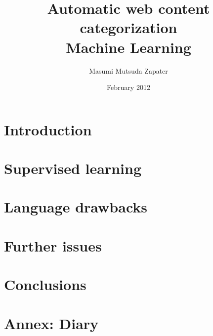 \documentclass[a4paper , titlepage]{report}
\author{Masumi Mutsuda Zapater}
\title{Automatic web content categorization \\ Machine Learning}
\date{February 2012}
\begin{document}
\maketitle



\tableofcontents


\chapter{Introduction}


\chapter{Supervised learning}


\chapter{Language drawbacks}


\chapter{Further issues}


\chapter{Conclusions}
%



\chapter{Annex: Diary }

\end{document}
